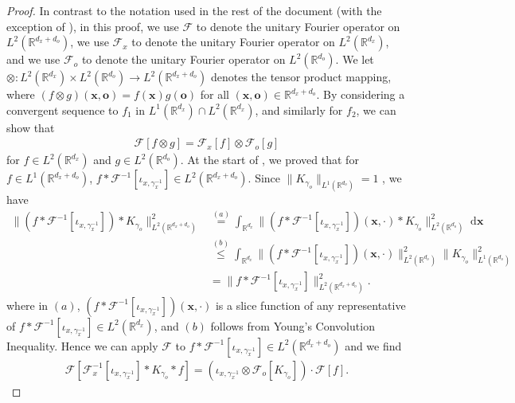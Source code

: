 \documentclass[11pt]{article}
\newcommand{\bx}{\mathbf x}
\newcommand{\bo}{\mathbf o}
\newcommand{\calF}{\mathcal{F}}
\newcommand{\0}{\mathbf{0}}
\begin{document}
\begin{appendix}
\begin{proof}
In contrast to the notation used in the rest of the document (with the exception of ), in this proof, we use $\calF$ to denote the unitary Fourier operator on $L^2(\mathbb{R}^{d_x+d_o})$, we use $\calF_x$ to denote the unitary Fourier operator on $L^2(\mathbb{R}^{d_x})$, and we use $\calF_o$ to denote the unitary Fourier operator on $L^2(\mathbb{R}^{d_o})$. We let $\otimes: L^2(\mathbb{R}^{d_x})\times L^2(\mathbb{R}^{d_o})\to L^2(\mathbb{R}^{d_x+d_o})$ denotes the tensor product mapping, where $(f\otimes g)(\bx,\bo) = f(\bx)g(\bo)$ for all $(\bx,\bo)\in \mathbb{R}^{d_x+d_o}$. By considering a convergent sequence to $f_1$ in $L^1(\mathbb{R}^{d_x})\cap L^2(\mathbb{R}^{d_x})$, and similarly for $f_2$, we can show that 
\begin{align*}
    \calF[f\otimes g] = \calF_x[f]\otimes \calF_o[g]
\end{align*}
for $f\in L^2(\mathbb{R}^{d_x})$ and $g\in L^2(\mathbb{R}^{d_o})$. At the start of , we proved that for $f\in L^1(\mathbb{R}^{d_x+d_o})$, $f\ast \calF^{-1}[\iota_{x,\gamma_x^{-1}}] \in L^2(\mathbb{R}^{d_x+d_o})$. Since $\|K_{\gamma_o}\|_{L^1(\mathbb{R}^{d_o})}= 1$ \citep[Section 4.1.2]{Giné_Nickl_2015}, we have
\begin{align*}
    \|(f\ast \calF^{-1}[\iota_{x,\gamma_x^{-1}}])\ast K_{\gamma_o}\|_{L^2(\mathbb{R}^{d_x+d_o})}^2 &\stackrel{(a)}{=} \int_{\mathbb{R}^{d_x}}\|(f\ast \calF^{-1}[\iota_{x,\gamma_x^{-1}}])(\bx,\cdot) \ast K_{\gamma_o}\|^2_{L^2(\mathbb{R}^{d_o})}\;\mathrm{d}\bx\\
    &\stackrel{(b)}{\leq} \int_{\mathbb{R}^{d_x}} \|(f\ast \calF^{-1}[\iota_{x,\gamma_x^{-1}}])(\bx,\cdot)\|^2_{L^2(\mathbb{R}^{d_o})} \|K_{\gamma_o}\|^2_{L^1(\mathbb{R}^{d_o})}\\
    & = \|f\ast \calF^{-1}[\iota_{x,\gamma_x^{-1}}]\|^2_{L^2(\mathbb{R}^{d_x+d_o})}.
\end{align*}
where in $(a)$, $(f\ast \calF^{-1}[\iota_{x,\gamma_x^{-1}}])(\bx,\cdot)$ is a slice function of any representative of $f\ast \calF^{-1}[\iota_{x,\gamma_x^{-1}}]\in L^2(\mathbb{R}^{d_x})$, and $(b)$ follows from Young's Convolution Inequality. Hence we can apply $\calF$ to $f\ast \calF^{-1}[\iota_{x,\gamma_x^{-1}}]\in L^2(\mathbb{R}^{d_x+d_o})$ and we find 
\begin{align*}
    \calF\left[\calF_x^{-1}[\iota_{x,\gamma_x^{-1}}] \ast K_{\gamma_o} \ast f\right] = (\iota_{x,\gamma_x^{-1}}\otimes \calF_o[K_{\gamma_o}]) \cdot \calF[f].
\end{align*}

\end{proof}
\end{appendix}
\end{document}
